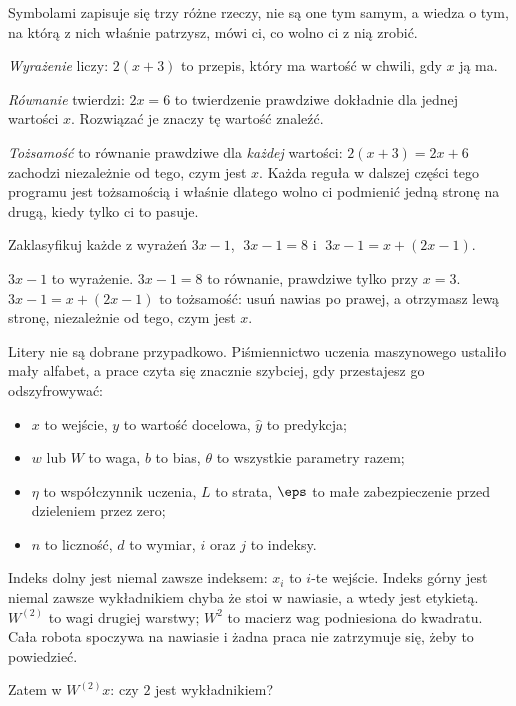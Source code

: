 \begin{fr}
Symbolami zapisuje się trzy różne rzeczy, nie są one tym samym, a wiedza o tym,
na którą z nich właśnie patrzysz, mówi ci, co wolno ci z nią zrobić.

\emph{Wyrażenie} liczy: $2(x+3)$ to przepis, który ma wartość w chwili, gdy
$x$ ją ma.

\emph{Równanie} twierdzi: $2x = 6$ to twierdzenie prawdziwe dokładnie dla
jednej wartości $x$. Rozwiązać je znaczy tę wartość znaleźć.

\emph{Tożsamość} to równanie prawdziwe dla \emph{każdej} wartości:
$2(x+3) = 2x+6$ zachodzi niezależnie od tego, czym jest $x$. Każda reguła w
dalszej części tego programu jest tożsamością i właśnie dlatego wolno ci
podmienić jedną stronę na drugą, kiedy tylko ci to pasuje.

Zaklasyfikuj każde z wyrażeń $3x - 1$, $\;3x - 1 = 8$ i
$\;3x - 1 = x + (2x - 1)$.
\dotline
\nextframe
\end{fr}

\begin{fr}
\begin{ansblock}
$3x - 1$ to wyrażenie. \quad $3x - 1 = 8$ to równanie, prawdziwe tylko przy
$x = 3$. \quad $3x - 1 = x + (2x - 1)$ to tożsamość: usuń nawias po prawej, a
otrzymasz lewą stronę, niezależnie od tego, czym jest $x$.
\end{ansblock}

\begin{notationbox}
Litery nie są dobrane przypadkowo. Piśmiennictwo uczenia maszynowego ustaliło
mały alfabet, a prace czyta się znacznie szybciej, gdy przestajesz go
odszyfrowywać:

\begin{itemize}
\item $x$ to wejście, $y$ to wartość docelowa, $\hat{y}$ to predykcja;
\item $w$ lub $W$ to waga, $b$ to bias, $\theta$ to wszystkie parametry razem;
\item $\eta$ to współczynnik uczenia, $L$ to strata, $\eps$ to małe
  zabezpieczenie przed dzieleniem przez zero;
\item $n$ to liczność, $d$ to wymiar, $i$ oraz $j$ to indeksy.
\end{itemize}

Indeks dolny jest niemal zawsze indeksem: $x_{i}$ to $i$-te wejście. Indeks
górny jest niemal zawsze wykładnikiem \dash{} chyba że stoi w nawiasie, a wtedy
jest etykietą. $W^{(2)}$ to wagi drugiej warstwy; $W^{2}$ to macierz wag
podniesiona do kwadratu. Cała robota spoczywa na nawiasie i żadna praca nie
zatrzymuje się, żeby to powiedzieć.
\end{notationbox}

Zatem w $W^{(2)}x$: czy $2$ jest wykładnikiem?
\nextframe
\end{fr}

